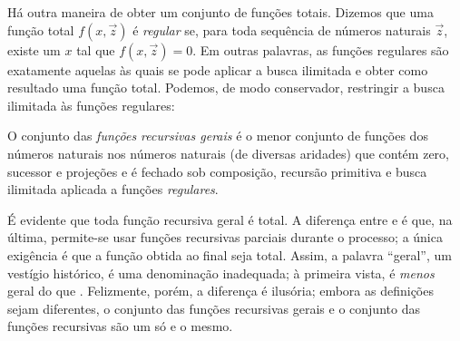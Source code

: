 \documentclass[../../../include/open-logic-section]{subfiles}
\begin{document}

Há outra maneira de obter um conjunto de funções totais. Dizemos que
uma função total $f(x,\vec z)$ é \emph{regular} se, para toda sequência
de números naturais $\vec z$, existe um $x$ tal que $f(x,\vec z) = 0$.
Em outras palavras, as funções regulares são exatamente aquelas às
quais se pode aplicar a busca ilimitada e obter como resultado uma
função total. Podemos, de modo conservador, restringir a busca
ilimitada às funções regulares:

\begin{defn}
O conjunto das \emph{funções recursivas gerais} é o menor conjunto de
funções dos números naturais nos números naturais (de diversas
aridades) que contém zero, sucessor e projeções e é fechado sob
composição, recursão primitiva e busca ilimitada aplicada a funções
\emph{regulares}.
\end{defn}

É evidente que toda função recursiva geral é total. A diferença entre
 e
 é que, na última, permite-se usar funções
recursivas parciais durante o processo; a única exigência é que a
função obtida ao final seja total. Assim, a palavra ``geral'', um
vestígio histórico, é uma denominação inadequada; à primeira vista,
 é \emph{menos} geral do que
. Felizmente, porém, a diferença é
ilusória; embora as definições sejam diferentes, o conjunto das
funções recursivas gerais e o conjunto das funções recursivas são um
só e o mesmo.
\end{document}
